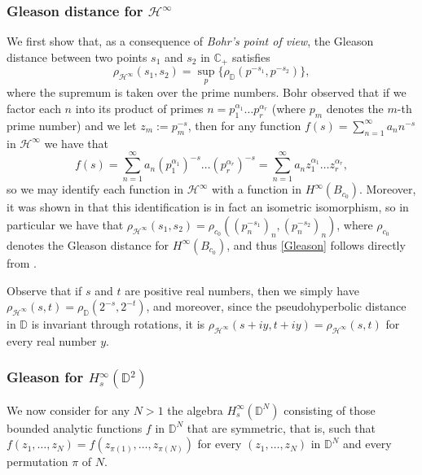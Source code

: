 \documentclass[preprint,12pt,number]{elsarticle}
\newcommand{\C}{\mathbb{C}}
\newcommand{\D}{\mathbb{D}}
\begin{document}
\subsubsection{Gleason distance for $\mathscr{H}^\infty$}

We first show that, as a consequence of \emph{Bohr's point of view}, the Gleason distance between two points $s_1$ and $s_2$ in $\C_+$ satisfies 
\begin{equation}\label{Gleason}
    \rho_{\mathscr{H}^{\infty}}(s_1,s_2)=\sup_{p}\{\rho_\D(p^{-s_1},p^{-s_2})\},
\end{equation} 
where the supremum is taken over the prime numbers. Bohr observed that if we factor each $n$ into its product of primes $n=p_1^{\alpha_1}\ldots p_r^{\alpha_r}$ (where $p_m$ denotes the $m$-th prime number) and we let $z_m:=p_m^{-s}$, then for any function $f(s)=\sum_{n=1}^\infty a_n n^{-s}$ in $\mathscr{H}^{\infty}$ we have that 
\[
f(s)=\sum_{n=1}^\infty a_n(p_1^{\alpha_1})^{-s}\ldots (p_r^{\alpha_r})^{-s} =\sum_{n=1}^\infty a_n z_1^{\alpha_1}\ldots z_r^{\alpha_r},
\] 
so we may identify each function in $\mathscr{H}^{\infty}$ with a function in $H^\infty(B_{c_0})$. Moreover, it was shown in \cite{HedenmalmLindqvistSeip1997} that this identification is in fact an isometric isomorphism, so in particular we have that $\rho_{\mathscr{H}^{\infty}}(s_1,s_2)=\rho_{c_0}((p_n^{-s_1})_n,(p_n^{-s_2})_n)$, where $\rho_{c_0}$ denotes the Gleason distance for $H^\infty(B_{c_0})$, and thus \eqref{Gleason} follows directly from \cite{AronGalindoLindstrom2003}.

Observe that if $s$ and $t$ are positive real numbers, then we simply have $\rho_{\mathscr{H}^{\infty}}(s,t)=\rho_\D(2^{-s},2^{-t})$, and moreover, since the pseudohyperbolic distance in $\D$ is invariant through rotations, it is $\rho_{\mathscr{H}^{\infty}}(s+iy,t+iy)=\rho_{\mathscr{H}^{\infty}}(s,t)$ for every real number $y$.

\subsubsection{Gleason for $H^\infty_s(\D^2)$}

We now consider for any $N>1$ the algebra $H^\infty_s(\D^N)$ consisting of those bounded analytic functions $f$ in $\D^N$ that are symmetric, that is, such that $f(z_1,\ldots,z_N)=f(z_{\pi(1)},\ldots,z_{\pi(N)})$ for every $(z_1,\ldots,z_N)$ in $\D^N$ and every permutation $\pi$ of $N$.
\end{document}
